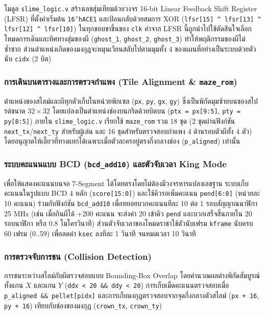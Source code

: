 โมดูล \texttt{slime\_logic.v} สร้างเลขสุ่มเทียมด้วยวงจร 16-bit Linear Feedback Shift Register (LFSR) ที่ตั้งค่าเริ่มต้น \texttt{16'hACE1} และป้อนกลับด้วยสมการ XOR (\texttt{lfsr[15] \textasciicircum{} lfsr[13] \textasciicircum{} lfsr[12] \textasciicircum{} lfsr[10]}) ในทุกขอบขาขึ้นของ \texttt{clk} ค่าจาก LFSR นี้ถูกนำไปใช้ตัดสินใจเลือกโหมดการเดินและทิศทางสุ่มของผี (\texttt{ghost\_1}, \texttt{ghost\_2}, \texttt{ghost\_3}) ทำให้พฤติกรรมของผีไม่ซ้ำซาก ส่วนตำแหน่งเกิดของมงกุฎจะหมุนเวียนสลับไปตามมุมทั้ง 4 ของแผนที่อย่างเป็นระบบด้วยตัวนับ \texttt{cidx} (2 บิต)

\subsubsection{การเดินบนตารางและการตรวจกำแพง (Tile Alignment \& \texttt{maze\_rom})}

ตำแหน่งของสไลม์และผีทุกตัวเก็บในหน่วยพิกเซล (\texttt{px}, \texttt{py}, \texttt{gx}, \texttt{gy}) ซึ่งเป็นพิกัดมุมซ้ายบนของสไปรต์ขนาด $32\times32$ โดยแปลงเป็นตำแหน่งช่องบนกริดด้วยบิตบน (\texttt{ptx = px[9:5]}, \texttt{pty = py[8:5]}) ภายใน \texttt{slime\_logic.v} เรียกใช้ \texttt{maze\_rom} รวม 18 ชุด (2 ชุดผ่านฟังก์ชัน \texttt{next\_tx}/\texttt{next\_ty} สำหรับผู้เล่น และ 16 ชุดสำหรับตรวจสอบกำแพง 4 ด้านรอบตัวผีทั้ง 4 ตัว) โดยอนุญาตให้เลี้ยวที่ทางแยกได้เฉพาะเมื่อตัวละครอยู่ตรงกึ่งกลางช่อง (\texttt{p\_aligned}) เท่านั้น

\subsubsection{ระบบคะแนนแบบ BCD (\texttt{bcd\_add10}) และตัวจับเวลา King Mode}

เพื่อให้แสดงคะแนนบนจอ 7-Segment ได้โดยตรงโดยไม่ต้องมีวงจรหารแปลงเลขฐาน ระบบเก็บคะแนนในรูปแบบ BCD 4 หลัก (\texttt{score[15:0]}) และใช้คิวรอเพิ่มคะแนน \texttt{pend[6:0]} (หน่วยละ 10 คะแนน) ร่วมกับฟังก์ชัน \texttt{bcd\_add10} เพื่อทยอยบวกคะแนนทีละ 10 ต่อ 1 รอบสัญญาณนาฬิกา 25 MHz (เช่น เมื่อกินผีได้ +200 คะแนน จะส่งค่า 20 เข้าคิว \texttt{pend} และบวกเสร็จสิ้นภายใน 20 รอบนาฬิกา หรือ 0.8 ไมโครวินาที) ส่วนตัวจับเวลาของโหมดราชาใช้ตัวนับเฟรม \texttt{kframe} นับครบ 60 เฟรม (0..59) เพื่อลดค่า \texttt{ksec} ลงทีละ 1 วินาที จนหมดเวลา 10 วินาที

\subsubsection{การตรวจจับการชน (Collision Detection)}

การชนระหว่างสไลม์กับผีตรวจสอบแบบ Bounding-Box Overlap โดยคำนวณผลต่างพิกัดสัมบูรณ์ทั้งแกน $X$ และแกน $Y$ (\texttt{ddx < 20 \&\& ddy < 20}) การเก็บเม็ดคะแนนตรวจสอบเมื่อ \texttt{p\_aligned \&\& pellet[pidx]} และการเก็บมงกุฎตรวจสอบจากจุดกึ่งกลางตัวสไลม์ (\texttt{px + 16}, \texttt{py + 16}) เทียบกับช่องของมงกุฎ (\texttt{crown\_tx}, \texttt{crown\_ty})

